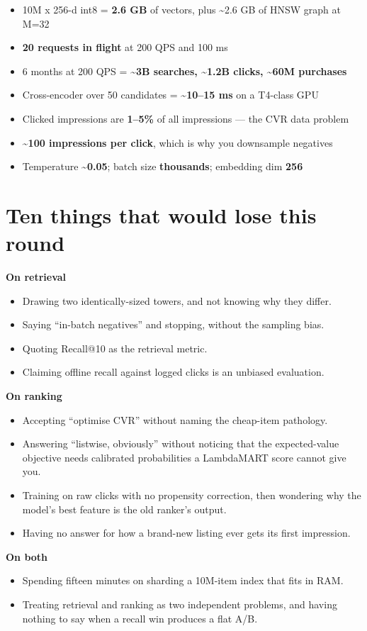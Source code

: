 \documentclass[10pt,twoside]{book}
\newcommand{\cchapter}[1]{\chapter{#1}}
\begin{document}
\begin{itemize}
\item 10M x 256-d int8 = \textbf{2.6 GB} of vectors, plus \textasciitilde{}2.6 GB of HNSW graph at M=32
\item \textbf{20 requests in flight} at 200 QPS and 100 ms
\item 6 months at 200 QPS = \textbf{\textasciitilde{}3B searches, \textasciitilde{}1.2B clicks, \textasciitilde{}60M purchases}
\item Cross-encoder over 50 candidates = \textbf{\textasciitilde{}10--15 ms} on a T4-class GPU
\item Clicked impressions are \textbf{1--5\%} of all impressions --- the CVR data problem
\item \textasciitilde{}\textbf{100 impressions per click}, which is why you downsample negatives
\item Temperature \textbf{\textasciitilde{}0.05}; batch size \textbf{thousands}; embedding dim \textbf{256}
\end{itemize}
\cchapter{Ten things that would lose this round}
\textbf{On retrieval}\par
\begin{itemize}
\item Drawing two identically-sized towers, and not knowing why they differ.
\item Saying ``in-batch negatives'' and stopping, without the sampling bias.
\item Quoting Recall@10 as the retrieval metric.
\item Claiming offline recall against logged clicks is an unbiased evaluation.
\end{itemize}
\textbf{On ranking}\par
\begin{itemize}
\item Accepting ``optimise CVR'' without naming the cheap-item pathology.
\item Answering ``listwise, obviously'' without noticing that the expected-value objective needs calibrated probabilities a LambdaMART score cannot give you.
\item Training on raw clicks with no propensity correction, then wondering why the model's best feature is the old ranker's output.
\item Having no answer for how a brand-new listing ever gets its first impression.
\end{itemize}
\textbf{On both}\par
\begin{itemize}
\item Spending fifteen minutes on sharding a 10M-item index that fits in RAM.
\item Treating retrieval and ranking as two independent problems, and having nothing to say when a recall win produces a flat A/B.
\end{itemize}
\end{document}
